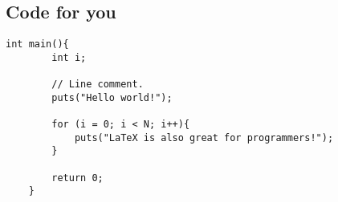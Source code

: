 \subsection*{Code for you}
\begin{lstlisting}[frame=single, caption={DemoCode},label=code::sttf]
    int main(){
        int i;

        // Line comment.
        puts("Hello world!");

        for (i = 0; i < N; i++){
            puts("LaTeX is also great for programmers!");
        }

        return 0;
    }
\end{lstlisting}